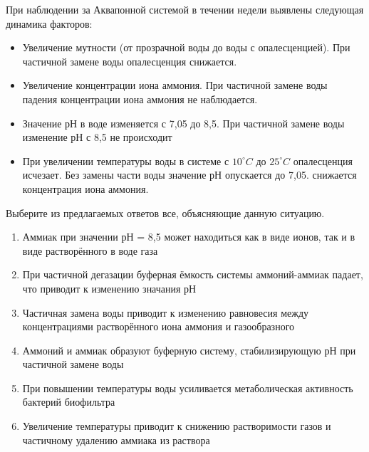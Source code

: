 
При наблюдении за Аквапонной системой в течении недели выявлены следующая динамика факторов:

\begin{itemize}
    \item Увеличение мутности (от прозрачной воды до воды с опалесценцией). При частичной замене воды опалесценция снижается.
    \item Увеличение концентрации  иона аммония. При частичной замене воды падения концентрации иона аммония не наблюдается.
    \item Значение рН в воде изменяется с 7,05 до 8,5. При частичной замене воды изменение рН с 8,5 не происходит
    \item При увеличении температуры воды в системе с $10^{\circ}C$ до $25^{\circ}C$ опалесценция исчезает. Без замены части воды значение  рН опускается до 7,05. снижается концентрация иона аммония.
\end{itemize}

Выберите из предлагаемых ответов все, объясняющие данную ситуацию.

\begin{enumerate}
    \item Аммиак при значении рН = 8,5 может находиться как в виде ионов, так и в виде растворённого в воде газа
    \item При частичной дегазации буферная ёмкость системы аммоний-аммиак падает, что приводит к изменению значания рН
    \item Частичная замена воды приводит к изменению равновесия между концентрациями растворённого иона аммония и газообразного
    \item Аммоний и аммиак образуют буферную систему, стабилизирующую рН при частичной замене воды
    \item При повышении температуры воды усиливается метаболическая активность бактерий биофильтра
    \item Увеличение температуры приводит к снижению растворимости газов и частичному удалению аммиака из раствора
\end{enumerate}